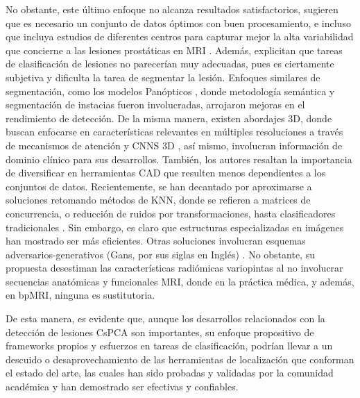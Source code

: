 No obstante, este último enfoque no alcanza resultados satisfactorios, sugieren que es necesario un conjunto de datos óptimos con buen procesamiento, e incluso que incluya estudios de diferentes centros para capturar mejor la alta variabilidad que concierne a las lesiones prostáticas en MRI . Además, explicitan que tareas de clasificación de lesiones no parecerían muy adecuadas, pues es ciertamente subjetiva y dificulta la tarea de segmentar la lesión.
Enfoques similares de segmentación, como los modelos Panópticos , donde metodología semántica y segmentación de instacias fueron involucradas, arrojaron mejoras en el rendimiento de detección. 
De la misma manera, existen abordajes 3D, donde buscan enfocarse en características relevantes en múltiples resoluciones a través de mecanismos de atención y CNNS 3D , así mismo, involucran información de dominio clínico para sus desarrollos. También, los autores resaltan la importancia de diversificar en herramientas CAD que resulten menos dependientes a los conjuntos de datos. Recientemente, se han decantado por aproximarse a soluciones retomando métodos de KNN, donde se refieren a  matrices de concurrencia, o reducción de ruidos por transformaciones, hasta clasificadores tradicionales . Sin embargo, es claro que estructuras especializadas en imágenes han mostrado ser más eficientes. Otras soluciones involucran esquemas adversarios-generativos (Gans, por sus siglas en Inglés) . No obstante, su propuesta desestiman las características radiómicas variopintas al no involucrar secuencias anatómicas y funcionales MRI, donde en la práctica médica, y además, en bpMRI, ninguna es sustitutoria.\par De esta manera, es evidente que, aunque los desarrollos relacionados con la detección de lesiones CsPCA son importantes, su enfoque propositivo de frameworks propios y esfuerzos en tareas de clasificación, podrían llevar a un descuido o desaprovechamiento de las herramientas de localización que conforman el estado del arte, las cuales han sido probadas y validadas por la comunidad académica y han demostrado ser efectivas y confiables.\pagebreak
